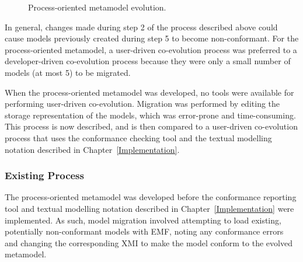 \begin{figure}[htbp]
	\centering
	\caption{Process-oriented metamodel evolution.}
\label{fig:po_mms}
\end{figure}

In general, changes made during step 2 of the process described above could cause models previously created during step 5 to become non-conformant. For the process-oriented metamodel, a user-driven co-evolution process was preferred to a developer-driven co-evolution process because they were only a small number of models (at most 5) to be migrated.

When the process-oriented metamodel was developed, no tools were available for performing user-driven co-evolution. Migration was performed by editing the storage representation of the models, which was error-prone and time-consuming. This process is now described, and is then compared to a user-driven co-evolution process that uses the conformance checking tool and the textual modelling notation described in Chapter~\ref{Implementation}.

\subsubsection{Existing Process}
The process-oriented metamodel was developed before the conformance reporting tool and textual modelling notation described in Chapter~\ref{Implementation} were implemented. As such, model migration involved attempting to load existing, potentially non-conformant models with EMF, noting any conformance errors and changing the corresponding XMI to make the model conform to the evolved metamodel.

